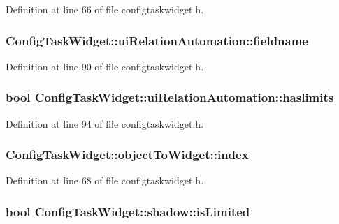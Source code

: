 Definition at line 66 of file configtaskwidget.\-h.

\hypertarget{group___u_a_v_object_widget_utils_ga727a26d7cef842f8e7cd274117a1153d}{
\subsubsection[{fieldname}]{ Config\-Task\-Widget\-::ui\-Relation\-Automation\-::fieldname}}\label{group___u_a_v_object_widget_utils_ga727a26d7cef842f8e7cd274117a1153d}


Definition at line 90 of file configtaskwidget.\-h.

\hypertarget{group___u_a_v_object_widget_utils_ga73f9beb614502506b14c6b5d235b9d44}{
\subsubsection[{haslimits}]{\setlength{\rightskip}{0pt plus 5cm}bool Config\-Task\-Widget\-::ui\-Relation\-Automation\-::haslimits}}\label{group___u_a_v_object_widget_utils_ga73f9beb614502506b14c6b5d235b9d44}


Definition at line 94 of file configtaskwidget.\-h.

\hypertarget{group___u_a_v_object_widget_utils_ga32127d63078e835a69c50d20ea1a678b}{
\subsubsection[{index}]{ Config\-Task\-Widget\-::object\-To\-Widget\-::index}}\label{group___u_a_v_object_widget_utils_ga32127d63078e835a69c50d20ea1a678b}


Definition at line 68 of file configtaskwidget.\-h.

\hypertarget{group___u_a_v_object_widget_utils_ga712acd84a5850623406835776b1840b4}{
\subsubsection[{is\-Limited}]{\setlength{\rightskip}{0pt plus 5cm}bool Config\-Task\-Widget\-::shadow\-::is\-Limited}}\label{group___u_a_v_object_widget_utils_ga712acd84a5850623406835776b1840b4}


